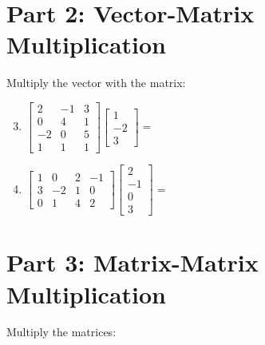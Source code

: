 \documentclass{article}
\begin{document}
\section*{Part 2: Vector-Matrix Multiplication}
Multiply the vector with the matrix:

\begin{enumerate}
	\setcounter{enumi}{2}
	\item $\begin{bmatrix} 2 & -1 & 3 \\ 0 & 4 & 1 \\ -2 & 0 & 5 \\ 1 & 1 & 1 \end{bmatrix} \begin{bmatrix} 1 \\ -2 \\ 3 \end{bmatrix} = $ \underline{\hspace{3cm}}
	
	\item $\begin{bmatrix} 1 & 0 & 2 & -1 \\ 3 & -2 & 1 & 0 \\ 0 & 1 & 4 & 2 \end{bmatrix} \begin{bmatrix} 2 \\ -1 \\ 0 \\ 3 \end{bmatrix} = $ \underline{\hspace{3cm}}
\end{enumerate}

\section*{Part 3: Matrix-Matrix Multiplication}
Multiply the matrices:
\end{document}
